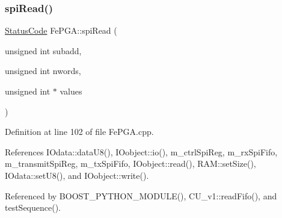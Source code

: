 \subsubsection{\texorpdfstring{spi\+Read()}{spiRead()}\hspace{0.1cm}{\footnotesize\ttfamily [1/3]}}
{\footnotesize\ttfamily \hyperlink{classStatusCode}{Status\+Code} Fe\+P\+G\+A\+::spi\+Read (\begin{DoxyParamCaption}\item[{unsigned int}]{subadd,  }\item[{unsigned int}]{nwords,  }\item[{unsigned int $\ast$}]{values }\end{DoxyParamCaption})}



Definition at line 102 of file Fe\+P\+G\+A.\+cpp.



References I\+Odata\+::data\+U8(), I\+Oobject\+::io(), m\+\_\+ctrl\+Spi\+Reg, m\+\_\+rx\+Spi\+Fifo, m\+\_\+transmit\+Spi\+Reg, m\+\_\+tx\+Spi\+Fifo, I\+Oobject\+::read(), R\+A\+M\+::set\+Size(), I\+Odata\+::set\+U8(), and I\+Oobject\+::write().



Referenced by B\+O\+O\+S\+T\+\_\+\+P\+Y\+T\+H\+O\+N\+\_\+\+M\+O\+D\+U\+L\+E(), C\+U\+\_\+v1\+::read\+Fifo(), and test\+Sequence().


